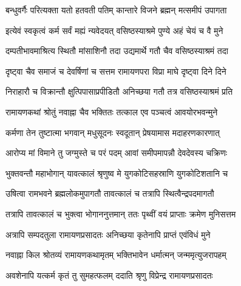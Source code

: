  

\twolineshloka
{बन्धुवर्गैः परित्यक्ता यतो हतवती पतिम्}
{कान्तारे विजने ब्रह्मन् मत्समीपं उपागता}%

 

\twolineshloka
{इत्येवं स्वकृत्वं कर्म सर्वं मह्यं न्यवेदयत्}
{वसिष्ठस्याश्रमे पुण्ये अहं चेयं च वै मुने}%

 

\twolineshloka
{दम्पतीभावमाश्रित्य स्थितौ मांसाशिनौ तदा}
{उद्यमार्थे गतौ चैव वसिष्ठस्याश्रमं तदा}%

 

\twolineshloka
{दृष्ट्वा चैव समाजं च देवर्षिणां च सत्तम}
{रामायणपरा विप्रा माघे दृष्ट्वा दिने दिने}%

 

\twolineshloka
{निराहारौ च विक्रान्तौ क्षुत्पिपासाप्रपीडितौ}
{अनिच्छया गतौ तत्र वसिष्ठस्याश्रमं प्रति}%

 

\twolineshloka
{रामायणकथां श्रोतुं नवाह्ना चैव भक्तितः}
{तत्काल एव पञ्चत्वं आवयोरभवन्मुने}%

 

\twolineshloka
{कर्मणा तेन तुष्टात्मा भगवान् मधुसूदनः}
{स्वदूतान् प्रेषयामास मदाहरणकारणात्}%

 

\twolineshloka
{आरोप्य मां विमाने तु जग्मुस्ते च परं पदम्}
{आवां समीपमापन्नौ देवदेवस्य चक्रिणः}%

 

\twolineshloka
{भुक्तवन्तौ महाभोगान् यावत्कालं श्रृणुष्व मे}
{युगकोटिसहस्राणि युगकोटिशतानि च}%

 

\twolineshloka
{उषित्वा रामभवने ब्रह्मलोकमुपागतौ}
{तावत्कालं च तत्रापि स्थित्वैन्द्रपदमागतौ}%

 

\twolineshloka
{तत्रापि तावत्कालं च भुक्त्वा भोगाननुत्तमान्}
{ततः पृथ्वीं वयं प्राप्ताः क्रमेण मुनिसत्तम}%

 

\twolineshloka
{अत्रापि सम्पदतुला रामायणप्रसादतः}
{अनिच्छया कृतेनापि प्राप्तं एवंविधं मुने}%

 

\twolineshloka
{नवाह्ना किल श्रोतव्यं रामायणकथामृतम्}
{भक्तिभावेन धर्मात्मन् जन्ममृत्युजरापहम्}%

 

\twolineshloka
{अवशेनापि यत्कर्म कृतं तु सुमहत्फलम्}
{ददाति श्रृणु विप्रेन्द्र रामायणप्रसादतः}%

